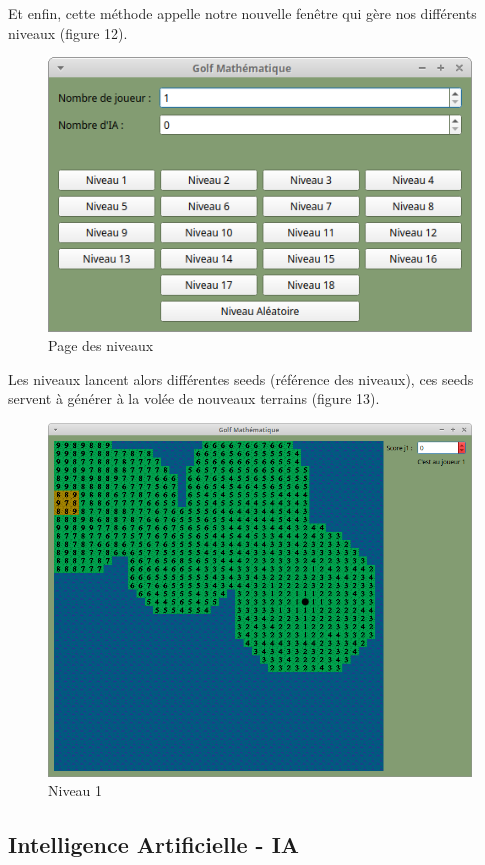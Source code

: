\documentclass{article}
\begin{document}
Et enfin, cette méthode appelle notre nouvelle fenêtre qui gère nos différents niveaux (figure 12).\\
\begin{figure}
\centering
\includegraphics[scale=0.5]{Images/niveaux.png}
\caption{Page des niveaux}
\end{figure}
Les niveaux lancent alors différentes seeds (référence des niveaux), ces seeds servent à générer à la volée de nouveaux terrains (figure 13).\\
\begin{figure}
\centering
\includegraphics[scale=0.3]{Images/niveau1.png}
\caption{Niveau 1}
\end{figure}
\newpage
\subsection{Intelligence Artificielle - IA}
\end{document}
